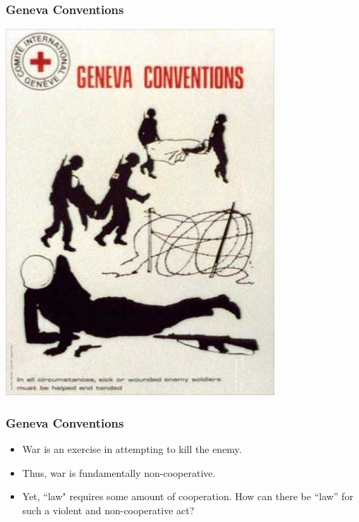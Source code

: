 \documentclass{beamer}
\begin{document}
\begin{frame} 
	\frametitle{\LARGE{Geneva Conventions}}
	\centering
	\includegraphics[width=\textwidth,height=\textheight,keepaspectratio]{GenevaCon.jpg}
\end{frame}

\begin{frame} 
	\frametitle{\LARGE{Geneva Conventions}}
	\begin{itemize}
		\item War is an exercise in attempting to kill the enemy. 
		\item Thus, war is fundamentally non-cooperative. \pause
		\item Yet, ``law" requires some amount of cooperation. How can there be “law” for such a violent and non-cooperative act?
		
	\end{itemize}
\end{frame}
\end{document}
